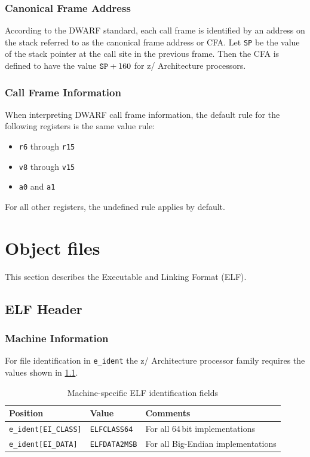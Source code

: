 \documentclass[USenglish,fontsize=11pt,twoside,%
  toc=bib,toc=idx,toc=graduated,numbers=noendperiod,
  bookmarks=true,
  bookmarksnumbered=true,
  bookmarksopen=true,
  bookmarksopenlevel=1,
  breaklinks=true,
  colorlinks=true,
  linkcolor=black,
  pdfpagelayout={TwoPageRight},
  pdfusetitle=true
]{scrreprt}
\newcommand{\NBITS}{64}
\newcommand{\STACKSIZE}{160}
\newcommand{\ARCH}{z/\kern-1pt Ar\-chi\-tec\-ture}
\newcommand{\NBITS}{32}
\newcommand{\STACKSIZE}{96}
\newcommand{\ARCH}{ESA/390}
\newenvironment{DIFnomarkup}{}{} %
\begin{document}
\subsection{Canonical Frame Address}
According to the DWARF standard, each call frame is identified by an
address on the stack referred to as the canonical frame address or CFA.
Let \texttt{SP} be the value of the stack pointer at the call site in the
previous frame.  Then the CFA is defined to have the value
\(\mbox{\texttt{SP}} + \STACKSIZE\) for \ARCH{} processors.

\subsection{Call Frame Information}
%
When interpreting DWARF call frame information, the default rule for the
following registers is the same value rule:
\begin{itemize}
\item \texttt{r6} through \texttt{r15}
\item \texttt{v8} through \texttt{v15}
\item \texttt{a0} and \texttt{a1}
\end{itemize}
For all other registers, the undefined rule applies by default.

\chapter{Object files}
\label{chobjfiles}
This section describes the Executable and Linking Format (ELF).

\section{ELF Header}
\subsection{Machine Information}
For file identification in \texttt{e\_ident} the \ARCH{} processor
family requires the values shown in \cref{tab:eident}.

\begin{table}
  \centering
  \begin{DIFnomarkup}
  \begin{tabular}{lll}
    \toprule
    Position & Value & Comments \\
    \midrule
    \texttt{e\_ident[EI\_CLASS]} & \texttt{ELFCLASS\NBITS{}} &
    For all \NBITS{}$\,$bit implementations \\
    \texttt{e\_ident[EI\_DATA]} & \texttt{ELFDATA2MSB} &
    For all Big-Endian implementations \\
    \bottomrule
  \end{tabular}
  \end{DIFnomarkup}
  \caption{Machine-specific ELF identification fields}
  \label{tab:eident}
\end{table}
\end{document}
